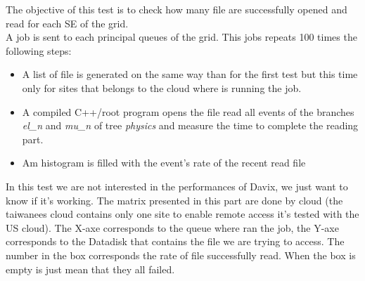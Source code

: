 The objective of this test is to check how many file are successfully opened and read for each SE of the grid.\\

A job is sent to each principal queues of the grid. This jobs repeats 100 times the following steps:
\begin{itemize}
	\item A list of file is generated on the same way than for the first test but this time only for sites that belongs to the cloud where is running the job.
	\item A compiled C++/root program opens the file read all events of the branches \textit{el\_n} and \textit{mu\_n} of tree \textit{physics} and measure the time to complete the reading part.
	\item Am histogram is filled with the event's rate of the recent read file
\end{itemize}

In this test we are not interested in the performances of Davix, we just want to know if it's working. The matrix presented in this part are done by cloud (the taiwanees cloud contains only one site to enable remote access it's tested with the US cloud). The X-axe corresponds to the queue where ran the job, the Y-axe corresponds to the Datadisk that contains the file we are trying to access. The number in the box corresponds the rate of file successfully read. When the box is empty is just mean that they all failed.
\vspace{1ex}
